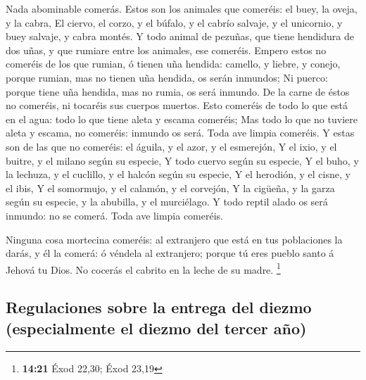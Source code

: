  Nada abominable comerás.  Estos son los
animales que comeréis: el buey, la oveja, y la cabra,  El
ciervo, el corzo, y el búfalo, y el cabrío salvaje, y el unicornio, y
buey salvaje, y cabra montés.  Y todo animal de pezuñas, que
tiene hendidura de dos uñas, y que rumiare entre los animales, ese
comeréis.  Empero estos no comeréis de los que rumian, ó
tienen uña hendida: camello, y liebre, y conejo, porque rumian, mas no
tienen uña hendida, os serán inmundos;  Ni puerco: porque
tiene uña hendida, mas no rumia, os será inmundo. De la carne de éstos
no comeréis, ni tocaréis sus cuerpos muertos.  Esto comeréis
de todo lo que está en el agua: todo lo que tiene aleta y escama
comeréis;  Mas todo lo que no tuviere aleta y escama, no
comeréis: inmundo os será.  Toda ave limpia comeréis.
 Y estas son de las que no comeréis: el águila, y el azor,
y el esmerejón,  Y el ixio, y el buitre, y el milano según
su especie,  Y todo cuervo según su especie, 
Y el buho, y la lechuza, y el cuclillo, y el halcón según su especie,
 Y el herodión, y el cisne, y el ibis,  Y el
somormujo, y el calamón, y el corvejón,  Y la cigüeña, y la
garza según su especie, y la abubilla, y el murciélago.  Y
todo reptil alado os será inmundo: no se comerá.  Toda ave
limpia comeréis.

 Ninguna cosa mortecina comeréis: al extranjero que está en
tus poblaciones la darás, y él la comerá: ó véndela al extranjero;
porque tú eres pueblo santo á Jehová tu Dios. No cocerás el cabrito en
la leche de su madre. \footnote{\textbf{14:21} Éxod 22,30; Éxod 23,19}

\hypertarget{regulaciones-sobre-la-entrega-del-diezmo-especialmente-el-diezmo-del-tercer-auxf1o}{%
\subsection{Regulaciones sobre la entrega del diezmo (especialmente el
diezmo del tercer
año)}\label{regulaciones-sobre-la-entrega-del-diezmo-especialmente-el-diezmo-del-tercer-auxf1o}}

